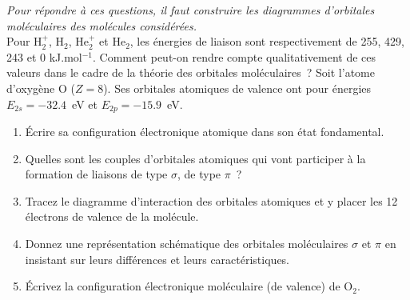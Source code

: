 %
\textsl{Pour répondre à ces questions, il faut construire les diagrammes d'orbitales moléculaires des molécules
considérées.}\\
Pour H$_2^+$, H$_2$, He$_2^+$ et He$_2$, les \'energies de liaison sont respectivement de 255, 429, 243 et 0 kJ.mol$^{-1}$. 
Comment peut-on rendre compte qualitativement de ces valeurs dans le cadre de la th\'eorie des orbitales mol\'eculaires~?
Soit l'atome d'oxyg\`ene O ($Z=8$). Ses orbitales atomiques de valence ont pour \'energies $E_{2s}=-32.4$~eV et $E_{2p}=-15.9$~eV.
\begin{enumerate}[\bf 1)]
\item \'Ecrire sa configuration \'electronique atomique dans son \'etat fondamental.
\item Quelles sont les couples d'orbitales atomiques qui vont participer \`a la formation de liaisons de type $\sigma$, de type $\pi$~?
\item Tracez le diagramme d'interaction des orbitales atomiques et y placer les 12 \'electrons de valence de la mol\'ecule. 
\item Donnez une repr\'esentation sch\'ematique des orbitales mol\'eculaires $\sigma$ et $\pi$ en insistant sur leurs diff\'erences et leurs caract\'eristiques. 
\item \'Ecrivez la configuration \'electronique mol\'eculaire (de valence) de O$_2$. 
\end{enumerate}

